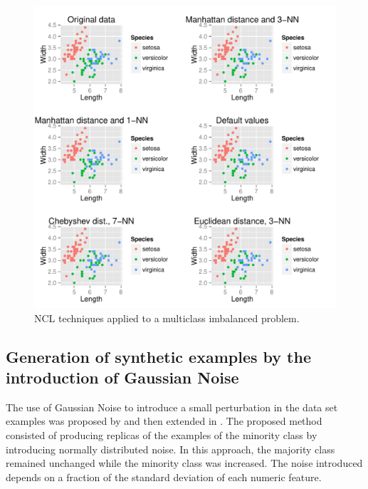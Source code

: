 \documentclass[10pt,a4paper]{article}\usepackage[]{graphicx}\usepackage[]{color}
\makeatletter
\def\maxwidth{ %
  \ifdim\Gin@nat@width>\linewidth
    \linewidth
  \else
    \Gin@nat@width
  \fi
}
\newenvironment{knitrout}{}{} %
\makeatother
\begin{document}
\begin{knitrout}\footnotesize
{}\color{fgcolor}\begin{figure}

{\centering \includegraphics[width=\maxwidth]{figures/UBL-NCL_plot-1} 

}

\caption[NCL techniques applied to a multiclass imbalanced problem]{NCL techniques applied to a multiclass imbalanced problem.}\label{fig:NCL_plot}
\end{figure}


\end{knitrout}

\subsection{Generation of synthetic examples by the introduction of Gaussian Noise}\label{sec:gnClassif}

The use of Gaussian Noise to introduce a small perturbation in the data set examples was proposed by \cite{lee1999regularization} and then extended in \cite{lee2000noisy}. The proposed method consisted of producing replicas of the examples of the minority class by introducing normally distributed noise. In this approach, the majority class remained unchanged while the minority class was increased. The noise introduced depends on a fraction of the standard deviation of each numeric feature.
\end{document}
